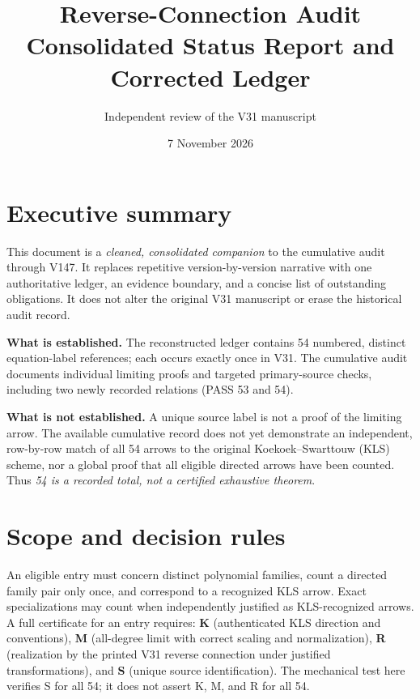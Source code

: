 \documentclass[10pt]{article}
\title{Reverse-Connection Audit\\\large Consolidated Status Report and Corrected Ledger}
\author{Independent review of the V31 manuscript}
\date{7 November 2026}
\begin{document}
\maketitle
\begin{center}\end{center}
\tableofcontents
\clearpage
\section{Executive summary}
This document is a \emph{cleaned, consolidated companion} to the cumulative audit through V147. It replaces repetitive version-by-version narrative with one authoritative ledger, an evidence boundary, and a concise list of outstanding obligations. It does not alter the original V31 manuscript or erase the historical audit record.

\textbf{What is established.} The reconstructed ledger contains 54 numbered, distinct equation-label references; each occurs exactly once in V31. The cumulative audit documents individual limiting proofs and targeted primary-source checks, including two newly recorded relations (PASS 53 and 54).

\textbf{What is not established.} A unique source label is not a proof of the limiting arrow. The available cumulative record does not yet demonstrate an independent, row-by-row match of all 54 arrows to the original Koekoek--Swarttouw (KLS) scheme, nor a global proof that all eligible directed arrows have been counted. Thus \emph{54 is a recorded total, not a certified exhaustive theorem}.

\section{Scope and decision rules}
An eligible entry must concern distinct polynomial families, count a directed family pair only once, and correspond to a recognized KLS arrow. Exact specializations may count when independently justified as KLS-recognized arrows. A full certificate for an entry requires: \textbf{K} (authenticated KLS direction and conventions), \textbf{M} (all-degree limit with correct scaling and normalization), \textbf{R} (realization by the printed V31 reverse connection under justified transformations), and \textbf{S} (unique source identification). The mechanical test here verifies S for all 54; it does not assert K, M, and R for all 54.
\end{document}
